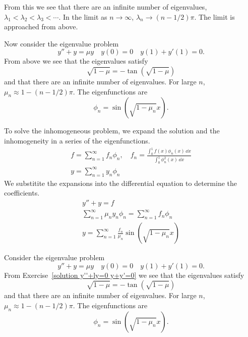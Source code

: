 {\begin{Solution}
  From this we see that there are an infinite number of eigenvalues,
  $\lambda_1 < \lambda_2 < \lambda_3 < \cdots$.  In the limit as $n \to \infty$,
  $\lambda_n \to (n-1/2)\pi$.  The limit is approached from above.

  Now consider the eigenvalue problem
  \[
  y'' + y = \mu y  \quad y(0) = 0 \quad y(1) + y'(1) = 0.
  \]
  From above we see that the eigenvalues satisfy
  \[
  \sqrt{1 - \mu} = - \tan \left( \sqrt{1 - \mu} \right)
  \]
  and that there are an infinite number of eigenvalues.  For large $n$, 
  $\mu_n \approx 1 - (n - 1/2) \pi$.
  The eigenfunctions are 
  \[
  \phi_n = \sin \left( \sqrt{1 - \mu_n} x \right).
  \]

  To solve the inhomogeneous problem, we expand the solution and the 
  inhomogeneity in a series of the eigenfunctions.
  \begin{gather*}
    f = \sum_{n=1}^\infty f_n \phi_n, \quad 
    f_n = \frac{ \int_0^1 f(x) \phi_n(x) \,\dd x }{ \int_0^1 \phi_n^2(x) \,\dd x }
    \\
    y = \sum_{n=1}^\infty y_n \phi_n
  \end{gather*}
  We substitite the expansions into the differential equation to determine
  the coefficients.
  \begin{gather*}
    y'' + y = f
    \\
    \sum_{n=1}^\infty \mu_n y_n \phi_n = \sum_{n=1}^\infty f_n \phi_n
    \\
    \boxed{
      y = \sum_{n=1}^\infty \frac{f_n}{\mu_n} \sin \left( \sqrt{1 - \mu_n} x \right)
      }
  \end{gather*}
\end{Solution}












\begin{Solution}
  \label{solution y''+y=f y+y'=0}
  Consider the eigenvalue problem
  \[
  y'' + y = \mu y  \quad y(0) = 0 \quad y(1) + y'(1) = 0.
  \]
  From Exercise~\ref{solution y''+ly=0 y+y'=0} we see that the eigenvalues 
  satisfy
  \[
  \sqrt{1 - \mu} = - \tan \left( \sqrt{1 - \mu} \right)
  \]
  and that there are an infinite number of eigenvalues.  For large $n$, 
  $\mu_n \approx 1 - (n - 1/2) \pi$.
  The eigenfunctions are 
  \[
  \phi_n = \sin \left( \sqrt{1 - \mu_n} x \right).
  \]


\end{Solution}}
